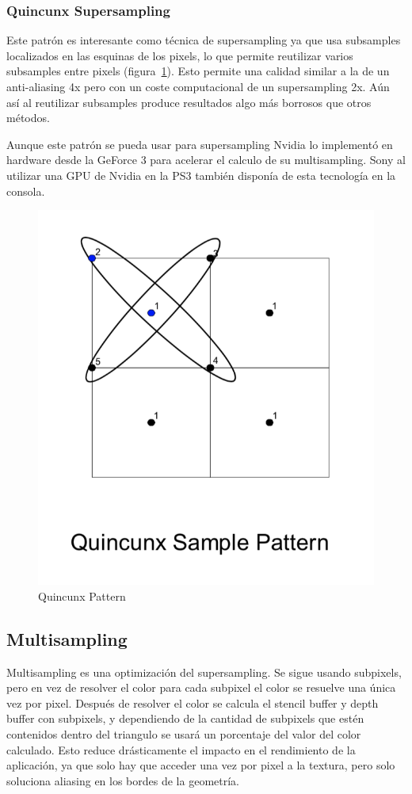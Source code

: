 \documentclass[withindex, glossary]{cam-thesis}
\begin{document}
\subsubsection{Quincunx Supersampling}

Este patrón es interesante como técnica de supersampling ya que usa subsamples localizados en las esquinas de los pixels, lo que permite reutilizar varios subsamples entre pixels (figura~\ref{fig:quincunx}). Esto permite una calidad similar a la de un anti-aliasing 4x pero con un coste computacional de un supersampling 2x. Aún así al reutilizar subsamples produce resultados algo más borrosos que otros métodos.

Aunque este patrón se pueda usar para supersampling Nvidia lo implementó en hardware desde la GeForce 3\cite{hraa} para acelerar el calculo de su multisampling. Sony al utilizar una GPU de Nvidia en la PS3 también disponía de esta tecnología en la consola.

\begin{figure}[!htbp]
    \includegraphics[width=.5\linewidth]{figures/quincunx.png}
    \caption{Quincunx Pattern\cite{hraa}}
    \label{fig:quincunx}
\end{figure}

\subsection{Multisampling}

Multisampling es una optimización del supersampling. Se sigue usando subpixels, pero en vez de resolver el color para cada subpixel el color se resuelve una única vez por pixel. Después de resolver el color se calcula el stencil buffer y depth buffer con subpixels, y dependiendo de la cantidad de subpixels que estén contenidos dentro del triangulo se usará un porcentaje del valor del color calculado. Esto reduce drásticamente el impacto en el rendimiento de la aplicación, ya que solo hay que acceder una vez por pixel a la textura, pero solo soluciona aliasing en los bordes de la geometría\cite{nvidiamsaa}\cite{msaa}.
\end{document}
